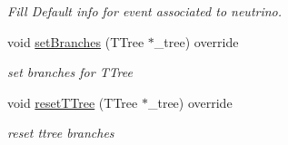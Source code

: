 \begin{DoxyCompactItemize}
\begin{DoxyCompactList}\small\item\em Fill Default info for event associated to neutrino. \end{DoxyCompactList}\item 
void \hyperlink{classanalysis_1_1VertexAnalysis_a14f9940c908530017f6cc5718a66e005}{set\+Branches} (T\+Tree $\ast$\+\_\+tree) override\hypertarget{classanalysis_1_1VertexAnalysis_a14f9940c908530017f6cc5718a66e005}{}\label{classanalysis_1_1VertexAnalysis_a14f9940c908530017f6cc5718a66e005}

\begin{DoxyCompactList}\small\item\em set branches for T\+Tree \end{DoxyCompactList}\item 
void \hyperlink{classanalysis_1_1VertexAnalysis_a117831b3b0b0d63e1647f9034f67b518}{reset\+T\+Tree} (T\+Tree $\ast$\+\_\+tree) override\hypertarget{classanalysis_1_1VertexAnalysis_a117831b3b0b0d63e1647f9034f67b518}{}\label{classanalysis_1_1VertexAnalysis_a117831b3b0b0d63e1647f9034f67b518}

\begin{DoxyCompactList}\small\item\em reset ttree branches \end{DoxyCompactList}\end{DoxyCompactItemize}
